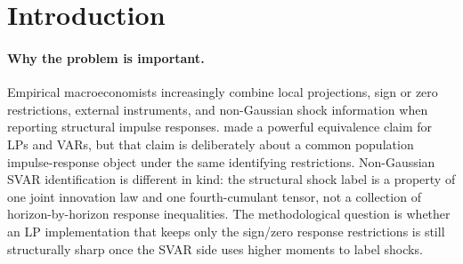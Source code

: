 \documentclass[11pt]{article}
\theoremstyle{definition}
\theoremstyle{plain}
\theoremstyle{remark}
\begin{document}
\begin{abstract}
This proposal asks where the Plagborg-Moller--Wolf LP/VAR equivalence stops once the structural label is supplied by non-Gaussian fourth cumulants rather than by second-moment sign restrictions alone.  The kernel is a sharp partial-identification boundary: the LP/sign relaxation and the non-Gaussian SVAR/sign identified set agree exactly when the LP-admissible response rows admit one common rotation that also diagonalizes the reduced-form fourth cumulant tensor.  Away from that cumulant-matching face, the proposal conjectures a computable support-function gap bounded below by a fourth-cumulant mismatch margin, so horizonwise LP-sign responses can satisfy the same signs while failing to come from any independent-component structural shock law.  The Gaussian limit is a sanity case, not a contradiction: when the fourth cumulant tensor carries no label information, the proposal collapses back to the usual sign-restricted LP/VAR equivalence.  If resolved, the theorem would give applied SVAR users a reportable diagnostic for when LP sign restrictions are only an outer relaxation of the non-Gaussian structural impulse-response set.
\end{abstract}

\section{Introduction}
\paragraph{Why the problem is important.}
Empirical macroeconomists increasingly combine local projections, sign or zero restrictions, external instruments, and non-Gaussian shock information when reporting structural impulse responses.  \citet{PlagborgMollerWolf2021} made a powerful equivalence claim for LPs and VARs, but that claim is deliberately about a common population impulse-response object under the same identifying restrictions.  Non-Gaussian SVAR identification is different in kind: the structural shock label is a property of one joint innovation law and one fourth-cumulant tensor, not a collection of horizon-by-horizon response inequalities.  The methodological question is whether an LP implementation that keeps only the sign/zero response restrictions is still structurally sharp once the SVAR side uses higher moments to label shocks.
\end{document}
